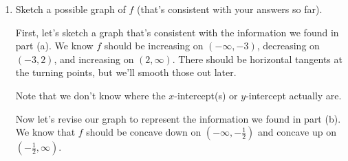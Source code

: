 \documentclass{article}
\begin{document}
\begin{enumerate}
\begin{enumerate}
\begin{solution}
        We can see that $f''(x)$ changes from negative to positive at $x=-\frac{1}{2}$, which means $f$ changes
        from concave down to concave up at $x=-\frac{1}{2}$. Also, $x=-\frac{1}{2}$ is in the domain of $f$.
        Therefore $f$ has an inflection point at $x=-\frac{1}{2}$. 
    \end{solution}

  \item
    \begin{problem}[\vfill]
      Sketch a possible graph of $f$ (that's consistent with your answers so far).
    \end{problem}

    \begin{solution}
      First, let's sketch a graph that's consistent with the information we found in part (a). We know
      $f$ should be increasing on $(-\infty, -3)$, decreasing on $(-3, 2)$, and increasing on $(2, \infty)$.
      There should be horizontal tangents at the turning points, but we'll smooth those out later.

      \begin{center}
      \end{center}

     Note that we don't know where the $x$-intercept(s) or $y$-intercept actually are.

     Now let's revise our graph to represent the information we found in part (b). We know that $f$ should
     be concave down on $(-\infty, -\frac{1}{2})$ and concave up on $(-\frac{1}{2}, \infty)$. 
     \begin{center}
      \end{center}
      
    \end{solution}


\end{enumerate}
\end{enumerate}
\end{document}
